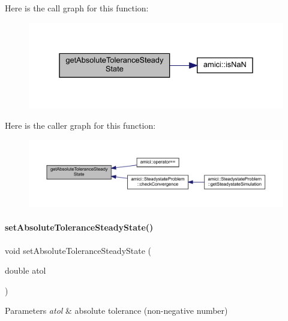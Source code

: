 Here is the call graph for this function\+:
\nopagebreak
\begin{figure}[H]
\begin{center}
\leavevmode
\includegraphics[width=331pt]{classamici_1_1_solver_adbb1549f9762649455bde39c29d47a03_cgraph}
\end{center}
\end{figure}
Here is the caller graph for this function\+:
\nopagebreak
\begin{figure}[H]
\begin{center}
\leavevmode
\includegraphics[width=350pt]{classamici_1_1_solver_adbb1549f9762649455bde39c29d47a03_icgraph}
\end{center}
\end{figure}
\mbox{\label{classamici_1_1_solver_a78e5814a90b24ff22d5ef1fbed1fc23c}} 
\paragraph{\texorpdfstring{set\+Absolute\+Tolerance\+Steady\+State()}{setAbsoluteToleranceSteadyState()}}
{\footnotesize\ttfamily void set\+Absolute\+Tolerance\+Steady\+State (\begin{DoxyParamCaption}\item[{double}]{atol }\end{DoxyParamCaption})}


\begin{DoxyParams}{Parameters}
{\em atol} & absolute tolerance (non-\/negative number) \\
\hline
\end{DoxyParams}


